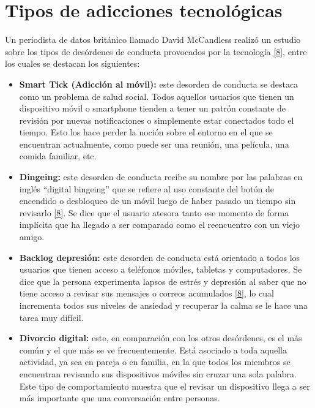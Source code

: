 \documentclass[12pt,spanish,Letterpaper,openany]{book}
\begin{document}

\hypertarget{tipos-de-adicciones-tecnoluxf3gicas}{%
\section{Tipos de adicciones tecnológicas}\label{tipos-de-adicciones-tecnoluxf3gicas}}

Un periodista de datos británico llamado David McCandless realizó un estudio sobre los tipos de desórdenes de conducta provocados por la tecnología \protect\hyperlink{articulo09_ref08}{{[}8{]}}, entre los cuales se destacan los siguientes:

\begin{itemize}
\item
  \textbf{Smart Tick (Adicción al móvil):} este desorden de conducta se destaca como un problema de salud social. Todos aquellos usuarios que tienen un dispositivo móvil o smartphone tienden a tener un patrón constante de revisión por nuevas notificaciones o simplemente estar conectados todo el tiempo. Esto los hace perder la noción sobre el entorno en el que se encuentran actualmente, como puede ser una reunión, una película, una comida familiar, etc.
\item
  \textbf{Dingeing:} este desorden de conducta recibe su nombre por las palabras en inglés ``digital bingeing'' que se refiere al uso constante del botón de encendido o desbloqueo de un móvil luego de haber pasado un tiempo sin revisarlo \protect\hyperlink{articulo09_ref08}{{[}8{]}}. Se dice que el usuario atesora tanto ese momento de forma implícita que ha llegado a ser comparado como el reencuentro con un viejo amigo.
\item
  \textbf{Backlog depresión:} este desorden de conducta está orientado a todos los usuarios que tienen acceso a teléfonos móviles, tabletas y computadores. Se dice que la persona experimenta lapsos de estrés y depresión al saber que no tiene acceso a revisar sus mensajes o correos acumulados \protect\hyperlink{articulo09_ref08}{{[}8{]}}, lo cual incrementa todos sus niveles de ansiedad y recuperar la calma se le hace una tarea muy difícil.
\item
  \textbf{Divorcio digital:} este, en comparación con los otros desórdenes, es el más común y el que más se ve frecuentemente. Está asociado a toda aquella actividad, ya sea en pareja o en familia, en la que todos los miembros se encuentran revisando sus dispositivos móviles sin cruzar una sola palabra. Este tipo de comportamiento muestra que el revisar un dispositivo llega a ser más importante que una conversación entre personas.
\end{itemize}
\end{document}
